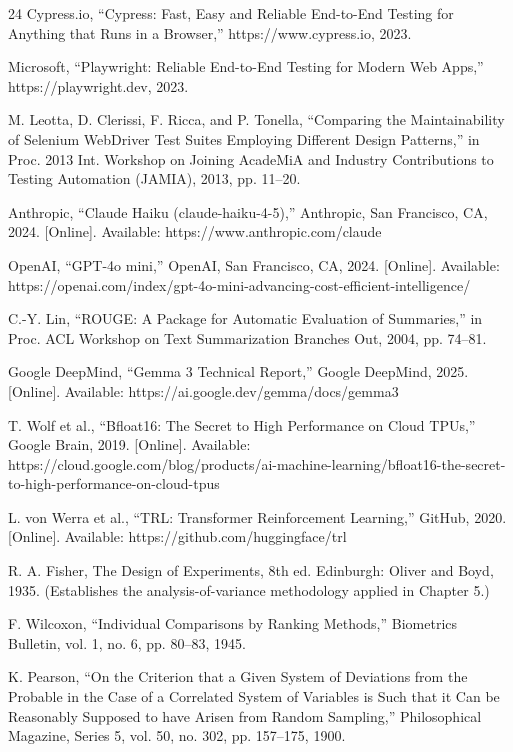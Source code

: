 \begin{thebibliography}{24}
 Cypress.io, ``Cypress: Fast, Easy and Reliable End-to-End Testing for Anything that Runs in a Browser,'' https://www.cypress.io, 2023.

 Microsoft, ``Playwright: Reliable End-to-End Testing for Modern Web Apps,'' https://playwright.dev, 2023.

 M. Leotta, D. Clerissi, F. Ricca, and P. Tonella, ``Comparing the Maintainability of Selenium WebDriver Test Suites Employing Different Design Patterns,'' in Proc. 2013 Int. Workshop on Joining AcadeMiA and Industry Contributions to Testing Automation (JAMIA), 2013, pp. 11--20.

 Anthropic, ``Claude Haiku (claude-haiku-4-5),'' Anthropic, San Francisco, CA, 2024. {[}Online{]}. Available: https://www.anthropic.com/claude

 OpenAI, ``GPT-4o mini,'' OpenAI, San Francisco, CA, 2024. {[}Online{]}. Available: https://openai.com/index/gpt-4o-mini-advancing-cost-efficient-intelligence/

 C.-Y. Lin, ``ROUGE: A Package for Automatic Evaluation of Summaries,'' in Proc. ACL Workshop on Text Summarization Branches Out, 2004, pp. 74--81.

 Google DeepMind, ``Gemma 3 Technical Report,'' Google DeepMind, 2025. {[}Online{]}. Available: https://ai.google.dev/gemma/docs/gemma3

 T. Wolf et al., ``Bfloat16: The Secret to High Performance on Cloud TPUs,'' Google Brain, 2019. {[}Online{]}. Available: https://cloud.google.com/blog/products/ai-machine-learning/bfloat16-the-secret-to-high-performance-on-cloud-tpus

 L. von Werra et al., ``TRL: Transformer Reinforcement Learning,'' GitHub, 2020. {[}Online{]}. Available: https://github.com/huggingface/trl

 R. A. Fisher, The Design of Experiments, 8th ed. Edinburgh: Oliver and Boyd, 1935. (Establishes the analysis-of-variance methodology applied in Chapter 5.)

 F. Wilcoxon, ``Individual Comparisons by Ranking Methods,'' Biometrics Bulletin, vol. 1, no. 6, pp. 80--83, 1945.

 K. Pearson, ``On the Criterion that a Given System of Deviations from the Probable in the Case of a Correlated System of Variables is Such that it Can be Reasonably Supposed to have Arisen from Random Sampling,'' Philosophical Magazine, Series 5, vol. 50, no. 302, pp. 157--175, 1900.

\end{thebibliography}
